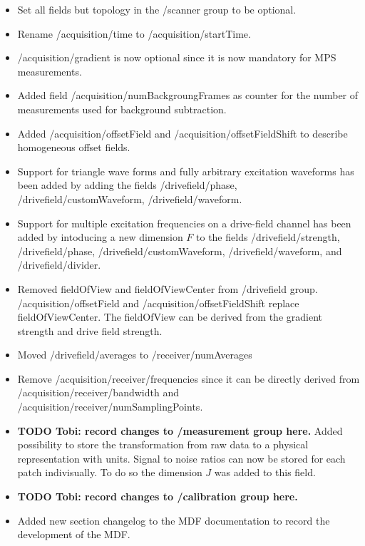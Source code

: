 \documentclass[landscape,a4paper]{article} %
\newcommand{\inlvar}[1]{{\ttfamily#1}}
\begin{document}
\begin{multicols}{2}
\begin{itemize}
	\item Set all fields but \inlvar{topology} in the \inlvar{/scanner} group to be optional.
	\item Rename \inlvar{/acquisition/time} to \inlvar{/acquisition/startTime}.
	\item \inlvar{/acquisition/gradient} is now optional since it is now mandatory for MPS measurements.
	\item Added field \inlvar{/acquisition/numBackgroungFrames} as counter for the number of measurements used for background subtraction.
	\item Added \inlvar{/acquisition/offsetField} and \inlvar{/acquisition/offsetFieldShift} to describe homogeneous offset fields.
	\item Support for triangle wave forms and fully arbitrary excitation waveforms has been added by adding the fields \inlvar{/drivefield/phase}, \inlvar{/drivefield/customWaveform}, \inlvar{/drivefield/waveform}.
	\item Support for multiple excitation frequencies on a drive-field channel has been added by intoducing a new dimension $F$ to the fields \inlvar{/drivefield/strength}, \inlvar{/drivefield/phase}, \inlvar{/drivefield/customWaveform}, \inlvar{/drivefield/waveform}, and \inlvar{/drivefield/divider}.
	\item Removed \inlvar{fieldOfView} and \inlvar{fieldOfViewCenter} from \inlvar{/drivefield} group. \inlvar{/acquisition/offsetField} and \inlvar{/acquisition/offsetFieldShift} replace \inlvar{fieldOfViewCenter}. The \inlvar{fieldOfView} can be derived from the gradient strength and drive field strength.
	\item Moved \inlvar{/drivefield/averages} to \inlvar{/receiver/numAverages}
	\item Remove \inlvar{/acquisition/receiver/frequencies} since it can be directly derived from \inlvar{/acquisition/receiver/bandwidth} and \inlvar{/acquisition/receiver/numSamplingPoints}.
	\item \textbf{TODO Tobi: record changes to \inlvar{/measurement} group here.} Added possibility to store the transformation from raw data to a physical representation with units. Signal to noise ratios can now be stored for each patch indivisually. To do so the dimension $J$ was added to this field.
	\item \textbf{TODO Tobi: record changes to \inlvar{/calibration} group here.} 
	\item Added new section changelog to the MDF documentation to record the development of the MDF.
\end{itemize}



\end{multicols}
\end{document}
